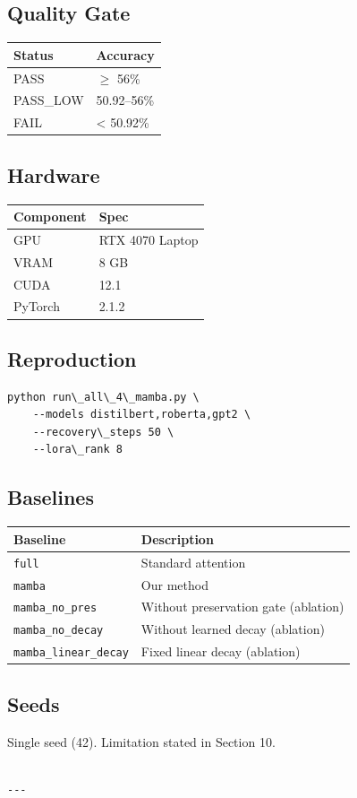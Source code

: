 \subsection{Quality Gate}

\begin{table}[H]
\centering
\small
\begin{tabular}{ll}
\toprule
\textbf{Status} & \textbf{Accuracy} \\
\midrule
PASS & $\ge$ 56\% \\
PASS\_LOW & 50.92--56\% \\
FAIL & \textless{} 50.92\% \\
\bottomrule
\end{tabular}
\end{table}

\subsection{Hardware}

\begin{table}[H]
\centering
\small
\begin{tabular}{ll}
\toprule
\textbf{Component} & \textbf{Spec} \\
\midrule
GPU & RTX 4070 Laptop \\
VRAM & 8 GB \\
CUDA & 12.1 \\
PyTorch & 2.1.2 \\
\bottomrule
\end{tabular}
\end{table}

\subsection{Reproduction}

\begin{lstlisting}
python run\_all\_4\_mamba.py \
    --models distilbert,roberta,gpt2 \
    --recovery\_steps 50 \
    --lora\_rank 8
\end{lstlisting}

\subsection{Baselines}

\begin{table}[H]
\centering
\small
\begin{tabular}{ll}
\toprule
\textbf{Baseline} & \textbf{Description} \\
\midrule
\texttt{full} & Standard attention \\
\texttt{mamba} & Our method \\
\texttt{mamba\_no\_pres} & Without preservation gate (ablation) \\
\texttt{mamba\_no\_decay} & Without learned decay (ablation) \\
\texttt{mamba\_linear\_decay} & Fixed linear decay (ablation) \\
\bottomrule
\end{tabular}
\end{table}

\subsection{Seeds}

Single seed (42). Limitation stated in Section 10.
\begin{lstlisting}

---
\end{lstlisting}